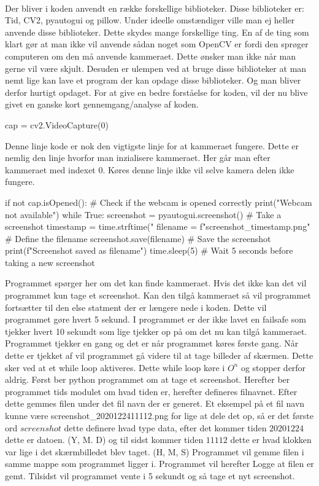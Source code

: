 \\ Der bliver i koden anvendt en række forskellige biblioteker. Disse biblioteker er: Tid, CV2, pyautogui og pillow. Under ideelle omstændiger ville man ej heller anvende disse biblioteker. Dette skydes mange forskellige ting. En af de ting som klart gør at man ikke vil anvende sådan noget som OpenCV er fordi den sprøger computeren om den må anvende kammeraet. Dette ønsker man ikke når man gerne vil være skjult. Desuden er ulempen ved at bruge disse biblioteker at man nemt lige kan lave et program der kan opdage disse biblioteker. Og man bliver derfor hurtigt opdaget. For at give en bedre forståelse for koden, vil der nu blive givet en ganske kort gennemgang/analyse af koden.
\begin{python}
    cap = cv2.VideoCapture(0)
\end{python}
Denne linje kode er nok den vigtigste linje for at kammeraet fungere. Dette er nemlig den linje hvorfor man inzialisere kammeraet. Her går man efter kammeraet med indexet 0. Køres denne linje ikke vil selve kamera delen ikke fungere. 
\begin{python}
    if not cap.isOpened(): # Check if the webcam is opened correctly
        print("Webcam not available")
        while True:
            screenshot = pyautogui.screenshot() # Take a screenshot
            timestamp = time.strftime("%
            filename = f"screenshot_{timestamp}.png" # Define the filename
            screenshot.save(filename) # Save the screenshot
            print(f"Screenshot saved as {filename}")
            time.sleep(5) # Wait 5 seconds before taking a new screenshot
\end{python}
Programmet spørger her om det kan finde kammeraet. Hvis det ikke kan det vil programmet kun tage et screenshot. Kan den tilgå kammeraet så vil programmet fortsætter til den else statment der er længere nede i koden. Dette vil programmet gøre hvert 5 sekund. I programmet er der ikke lavet en failsafe som tjekker hvert 10 sekundt som lige tjekker op på om det nu kan tilgå kammeraet. Programmet tjekker en gang og det er når programmet køres første gang. Når dette er tjekket af vil programmet gå videre til at tage billeder af skærmen. Dette sker ved at et while loop aktiveres. Dette while loop køre i \begin{math}O^n\end{math} og stopper derfor aldrig. Først ber python programmet om at tage et screenshot. Herefter ber programmet tids modulet om hvad tiden er, herefter defineres filnavnet. Efter dette gemmes filen under det fil navn der er generet. Et eksempel på et fil navn kunne være screenshot\_2020122411112.png for lige at dele det op, så er det første ord $screenshot$ dette definere hvad type data, efter det kommer tiden $20201224$ dette er datoen. (Y, M. D) og til sidst kommer tiden $11112$ dette er hvad klokken var lige i det skærmbilledet blev taget. (H, M, S) Programmet vil gemme filen i samme mappe som programmet ligger i. Programmet vil herefter Logge at filen er gemt. Tilsidst vil programmet vente i 5 sekundt og så tage et nyt screenshot. 
